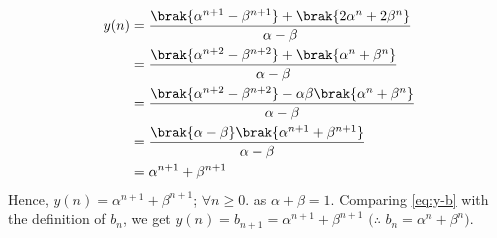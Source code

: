 \documentclass[journal,12pt,twocolumn]{IEEEtran}
\renewcommand\thesection{\arabic{section}}
\begin{document}
\begin{enumerate}[label=\thesection.\arabic*,ref=\thesection.\theenumi]
\begin{align}
	y(n) &= \frac{\brak{\alpha^{n + 1} - \beta^{n + 1}} + \brak{2\alpha^n + 2\beta^n}}{\alpha - \beta} \\
	&= \frac{\brak{\alpha^{n + 2} - \beta^{n + 2}} + \brak{\alpha^{n} + \beta^{n}}}{\alpha - \beta} \label{eq:y-b} \\
	&= \frac{\brak{\alpha^{n + 2} - \beta^{n + 2}} - \alpha\beta\brak{\alpha^{n} + \beta^{n}}}{\alpha - \beta} \\
	&= \frac{\brak{\alpha - \beta}\brak{\alpha^{n + 1} + \beta^{n + 1}}}{\alpha - \beta} \\
	&= \alpha^{n + 1} + \beta^{n + 1}
\end{align}
Hence, $y(n) = \alpha^{n + 1} + \beta^{n + 1}$; $\forall n \geq 0.$ as $\alpha + \beta = 1$.
Comparing \eqref{eq:y-b} with the definition of $b_n$, we get $y(n) = b_{n + 1} =  \alpha^{n + 1} + \beta^{n + 1}$
$(\therefore$ $b_n = \alpha^n + \beta^n)$.
\end{enumerate}
\end{document}

